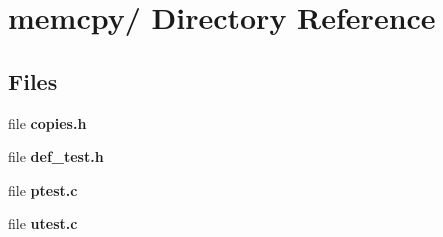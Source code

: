 \section{memcpy/ Directory Reference}
\label{dir_000003}
\subsection*{Files}
\begin{CompactItemize}
\item 
file {\bf copies.h}
\item 
file {\bf def_test.h}
\item 
file {\bf ptest.c}
\item 
file {\bf utest.c}
\end{CompactItemize}
